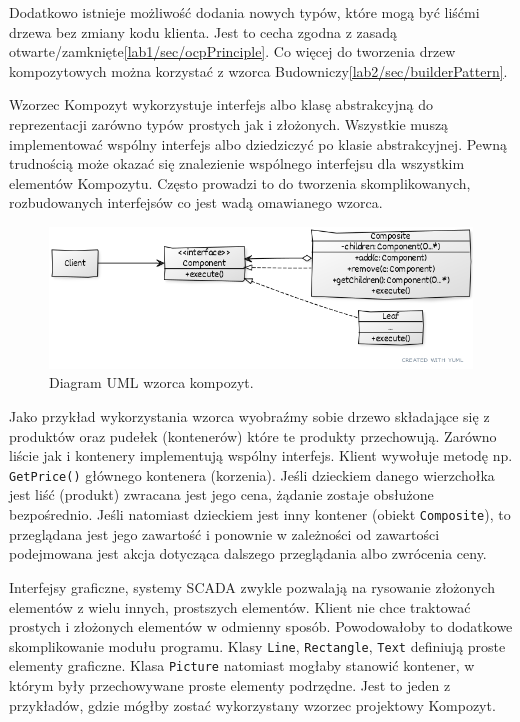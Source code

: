 Dodatkowo istnieje możliwość dodania nowych typów, które mogą być liśćmi drzewa bez zmiany kodu klienta. Jest to cecha zgodna z zasadą otwarte/zamknięte\ref{lab1/sec/ocpPrinciple}. Co więcej do tworzenia drzew kompozytowych można korzystać z wzorca Budowniczy\ref{lab2/sec/builderPattern}.


Wzorzec Kompozyt wykorzystuje interfejs albo klasę abstrakcyjną do reprezentacji zarówno typów prostych jak i złożonych. Wszystkie muszą implementować wspólny interfejs albo dziedziczyć po klasie abstrakcyjnej. Pewną trudnością może okazać się znalezienie wspólnego interfejsu dla wszystkim elementów Kompozytu. Często prowadzi to do tworzenia skomplikowanych, rozbudowanych interfejsów co jest wadą omawianego wzorca.
 
\begin{figure}[hbt!]
	\centering
	\includegraphics[width=0.8\linewidth]{images/CompositeUml}
	\caption{Diagram UML wzorca kompozyt.}
	\label{lab3/fig/CompositeUml}
\end{figure}
%

Jako przykład wykorzystania wzorca wyobraźmy sobie drzewo składające się z produktów oraz pudełek (kontenerów) które te produkty przechowują. Zarówno liście jak i kontenery implementują wspólny interfejs. Klient wywołuje metodę np. \texttt{GetPrice()} głównego kontenera (korzenia). Jeśli dzieckiem danego wierzchołka jest liść (produkt) zwracana jest jego cena, żądanie zostaje obsłużone bezpośrednio. Jeśli natomiast dzieckiem jest inny kontener (obiekt \texttt{Composite}), to przeglądana jest jego zawartość i ponownie w zależności od zawartości podejmowana jest akcja dotycząca dalszego przeglądania albo zwrócenia ceny.

Interfejsy graficzne, systemy SCADA zwykle pozwalają na rysowanie złożonych elementów z wielu innych, prostszych elementów. Klient nie chce traktować prostych i złożonych elementów w odmienny sposób. Powodowałoby to dodatkowe skomplikowanie modułu programu. Klasy \texttt{Line}, \texttt{Rectangle}, \texttt{Text} definiują proste elementy graficzne. Klasa \texttt{Picture} natomiast mogłaby stanowić kontener, w którym były przechowywane proste elementy podrzędne. Jest to jeden z przykładów, gdzie mógłby zostać wykorzystany wzorzec projektowy Kompozyt.

